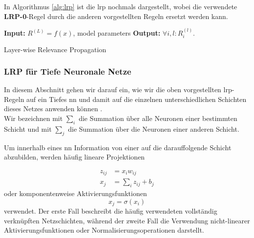 \documentclass[twoside, 12pt,a4paper]{book}
\numberwithin{equation}{section}
\begin{document}
	\noindent In Algorithmus \autoref{alg:lrp} ist die \ac{lrp} nochmals dargestellt, wobei die verwendete \textbf{LRP-0}-Regel durch die anderen vorgestellten Regeln ersetzt werden kann.
	
	\begin{algorithm}
		\hspace*{\algorithmicindent} \textbf{Input: } $R^{(L)} = f(x)$, model parameters \newline
		\hspace*{\algorithmicindent} \textbf{Output: } $\forall i,l: R_i^{(l)}$. 
		
		\caption{Layer-wise Relevance Propagation}
		\label{alg:lrp}
		
		\begin{algorithmic}
			\ENDFOR
		\end{algorithmic}
	\end{algorithm}	

	

	
	
	
	\subsubsection{LRP für Tiefe Neuronale Netze} \label{lrp_für_dnn}
	In diesem Abschnitt gehen wir darauf ein, wie wir die oben vorgestellten \ac{lrp}-Regeln auf ein Tiefes \ac{nn} und damit auf die einzelnen unterschiedlichen Schichten dieses Netzes anwenden können \cite{LRP_DNN, lapuschkin, lrp_overview}.\\
	
	\noindent Wir bezeichnen mit $\sum_i$ die Summation über alle Neuronen einer bestimmten Schicht und mit $\sum_j$ die Summation über die Neuronen einer anderen Schicht. 
	
	\noindent Um innerhalb eines \ac{nn} Information von einer auf die darauffolgende Schicht abzubilden, werden häufig lineare Projektionen
	
	\begin{align}
		z_{ij} &= x_iw_{ij}\\
		x_j &= \sum_i{z_{ij} + b_j} \label{eq:linear_projection}
	\end{align}
	 oder komponentenweise Aktivierungsfunktionen
	 \begin{equation}
	 	x_j = \sigma(x_i)
	 \end{equation}
	 verwendet.
	 Der erste Fall beschreibt die häufig verwendeten vollständig verknüpften Netzschichten, während der zweite Fall die Verwendung nicht-li\-ne\-a\-rer Aktivierungsfunktionen oder Normalisierungsoperationen darstellt.
	 
\end{document}
